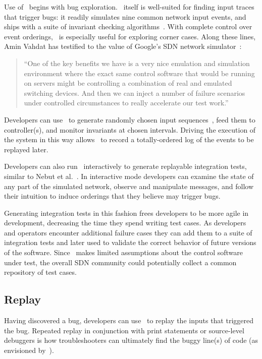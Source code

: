 Use of \projectname~begins with bug exploration.
\projectname~itself is well-suited for finding input traces that trigger bugs:
it readily simulates nine common network input events, and ships with a suite of invariant checking
algorithms~\cite{hsa}. With complete control over event orderings, \projectname~is
especially useful for exploring corner cases.
Along these lines, Amin Vahdat
has testified to the value of Google's SDN network simulator~\cite{vadhat}:
\begin{quote}
``One of the key benefits we have is a very nice emulation and
simulation environment where the exact same control software that would be
running on servers might be controlling a combination of real and emulated
switching devices. And then we can inject a number of failure scenarios under
controlled circumstances to really accelerate our test work.''
\end{quote}

Developers can use \projectname~to generate randomly chosen input
sequences~\cite{Miller:1990:ESR:96267.96279}, feed them to controller(s), and monitor invariants at chosen
intervals. Driving the
execution of the system in this way allows \projectname~to record a
totally-ordered log of the events to be replayed later.

Developers can also run \projectname~interactively to generate replayable integration
tests, similar to Nebut et al.~\cite{automated_tests}. In interactive
mode developers can
examine the state of any part of the simulated network,
observe and manipulate messages, and follow their
intuition to induce orderings that they believe may trigger bugs.

Generating integration tests in this fashion frees developers to be more agile in
development, decreasing the time they spend writing test cases.
As developers and operators encounter additional failure cases they can add
them to a suite of integration tests and later used to validate the correct
behavior of future versions of the software. Since \projectname~makes
limited assumptions about the control software under test, the overall SDN community
could potentially collect a common repository of test cases.

\subsection{Replay}

Having discovered a bug, developers can use \projectname~to replay the
inputs that triggered the bug. Repeated replay in conjunction with
print statements or source-level debuggers is how troubleshooters can ultimately find the buggy
line(s) of code (as envisioned by~\cite{ofrewind}).

